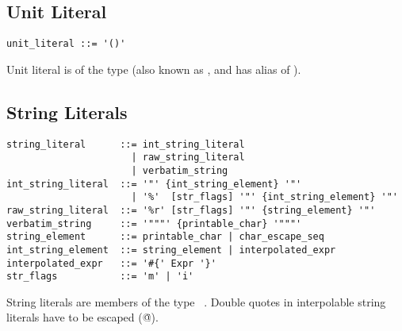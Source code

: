 \subsection{Unit Literal}
\label{sec:unit-literal}

\syntax\begin{lstlisting}
unit_literal ::= '()'
\end{lstlisting}

Unit literal is of the type  (also known as , and has alias of ).





\subsection{String Literals}
\label{sec:stringliterals}

\syntax\begin{lstlisting}
string_literal      ::= int_string_literal
                      | raw_string_literal
                      | verbatim_string
int_string_literal  ::= '"' {int_string_element} '"'
                      | '%'  [str_flags] '"' {int_string_element} '"'
raw_string_literal  ::= '%r' [str_flags] '"' {string_element} '"'
verbatim_string     ::= '"""' {printable_char} '"""'
string_element      ::= printable_char | char_escape_seq
int_string_element  ::= string_element | interpolated_expr
interpolated_expr   ::= '#{' Expr '}'
str_flags           ::= 'm' | 'i'
\end{lstlisting}

String literals are members of the type ~\lstinline@String@. Double quotes in interpolable string literals have to be escaped (\lstinline@\"@).

